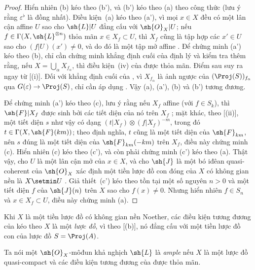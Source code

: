 \documentclass[oneside,10pt]{amsart}
\makeatletter
\newcommand{\ega@arrow}[2]{\mathchoice{#1}{#2}{#2}{#2}}
\renewcommand{\to}{\ega@arrow{\longrightarrow}{\rightarrow}}
\let\EGAOriginalLabel\label
\renewcommand{\label}[1]{\phantomsection\EGAOriginalLabel{#1}}
\makeatother
\begin{document}
\begin{proof}
Hiển nhiên (b) kéo theo (b'), và (b') kéo theo (a) theo công thức  (lưu ý rằng $\varepsilon^\flat$ là đồng nhất).
Điều kiện~(a) kéo theo (a'), vì mọi $x\in X$ đều có một lân cận affine $U$ sao cho $\sh{L}|U$ đẳng cấu với $\sh{O}_X|U$;
nếu $f\in\Gamma(X,\sh{L}^{\otimes n})$ thỏa mãn $x\in X_f\subset U$, thì $X_f$ cũng là tập hợp các $x'\in U$ sao cho $(f|U)(x')\neq0$, và do đó là một tập mở affine .
Để chứng minh (a') kéo theo (b), chỉ cần chứng minh khẳng định cuối của định lý và kiểm tra thêm rằng, nếu $X=\bigcup_\alpha X_{f_\alpha}$, thì điều kiện~(iv) của  được thỏa mãn.
Điểm sau suy ra ngay từ [(i)].
Đối với khẳng định cuối của , vì $X_{f_\alpha}$ là ảnh ngược của $(\Proj(S))_{f_\alpha}$ qua $G(\varepsilon)\to\Proj(S)$, chỉ cần áp dụng .
Vậy (a), (a'), (b) và (b') tương đương.

Để chứng minh (a') kéo theo (c), lưu ý rằng nếu $X_f$ affine (với $f\in S_k$), thì $\sh{F}|X_f$ được sinh bởi các tiết diện của nó trên $X_f$ ;
mặt khác, theo [(ii)], một tiết diện $s$ như vậy có dạng $(t|X_f)\otimes(f|X_f)^{-m}$, trong đó $t\in\Gamma(X,\sh{F}(km))$;
theo định nghĩa, $t$ cũng là một tiết diện của $\sh{F}_{km}$, nên $s$ đúng là một tiết diện của $\sh{F}_{km}(-km)$ trên $X_f$, điều này chứng minh (c).
Hiển nhiên (c) kéo theo (c'), và còn phải chứng minh (c') kéo theo (a).
Thật vậy, cho $U$ là một lân cận mở của $x\in X$, và cho $\sh{J}$ là một bó iđêan quasi-coherent của $\sh{O}_X$ xác định một tiền lược đồ con đóng của $X$ có không gian nền là $X\setmin U$ .
Giả thiết~(c') kéo theo tồn tại một số nguyên $n>0$ và một tiết diện $f$ của $\sh{J}(n)$ trên $X$ sao cho $f(x)\neq0$.
Nhưng hiển nhiên $f\in S_n$ và $x\in X_f\subset U$, điều này chứng minh (a).
\end{proof}

Khi $X$ là một tiền lược đồ có không gian nền Noether, các điều kiện tương đương của  kéo theo $X$ là một \emph{lược đồ}, vì theo [(b)], nó đẳng cấu với một tiền lược đồ con của lược đồ $S=\Proj(A)$.

\begin{definition}[4.5.3]
\label{II.4.5.3}
Ta nói một $\sh{O}_X$-môđun khả nghịch $\sh{L}$ là \emph{ample} nếu $X$ là một lược đồ quasi-compact và các điều kiện tương đương của  được thỏa mãn.
\end{definition}
\end{document}
